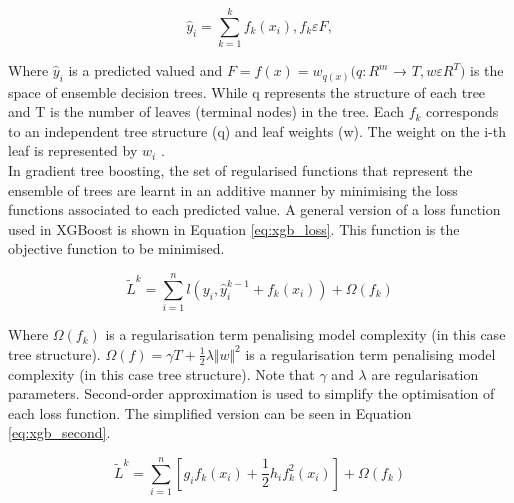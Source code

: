 \vspace{10pt}

\begin{equation} \label{eq:xgb_reg}
\hat{y}_{i} = \sum_{k=1}^{k}f_{k}(x_{i}), f_{k} \varepsilon F,
\end{equation}

\vspace{10pt}


Where $\hat{y}_{i}$ is a predicted valued and $F = {f(x) = w_{q(x)}}(q : R^{m}$ → $T, w \varepsilon R^{T})$ is the space of ensemble decision trees. While q represents the structure of each tree and T is the number of leaves (terminal nodes) in the tree. Each $f_k$ corresponds to an independent tree structure (q) and leaf weights (w). The weight on the i-th leaf is represented by $w_i$ \parencite{XGBoost}. \\

In gradient tree boosting, the set of regularised functions that represent the ensemble of trees are learnt in an additive manner by minimising the loss functions associated to each predicted value. A general version of a loss function used in XGBoost is shown in Equation \ref{eq:xgb_loss}. This function is the objective function to be minimised.

\vspace{10pt}

\begin{equation} \label{eq:xgb_loss}
\tilde{L}^{k} = \sum_{i=1}^{n}l(y_i,\hat{y}_{i}^{k-1} + f_k(x_i))+ \Omega(f_k)
\end{equation}

\vspace{10pt}

Where $\Omega(f_k)$ is a regularisation term penalising model complexity (in this case tree structure). $\Omega(f) = \gamma T + \frac{1}{2} \lambda \Vert w \Vert^2$ is a regularisation term penalising model complexity (in this case tree structure). Note that $\gamma$ and $\lambda$ are regularisation parameters. Second-order approximation is used to simplify the optimisation of each loss function. The simplified version can be seen in Equation \ref{eq:xgb_second}.

\vspace{10pt}

\begin{equation} \label{eq:xgb_second}
\tilde{L}^{k} = \sum_{i=1}^{n}[g_i f_k(x_i) + \dfrac{1}{2} h_i f^{2}_{k}(x_i)] + \Omega(f_k)
\end{equation}

